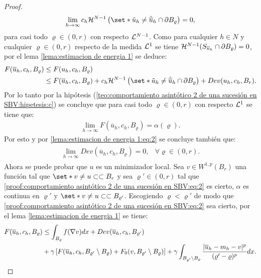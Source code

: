\documentclass[a4paper,11pt,spanish, twoside, leqno]{tfm-uam}
\begin{document}
\begin{proof}
\begin{align*}
\lim_{h\to\infty}c_{h}\Hm{N-1}\left ( \set*{\tilde{u}_{h}\not = \tilde{\overline{u}}_{h}}\cap \partial B_{\varrho}\right )=0,
\end{align*}
para casi todo $\varrho\in (0,r)$ con respecto $\mathcal{L}^{N-1}$. Como para cualquier $h\in N$ y cualquier $\varrho\in (0,r)$ respecto de la medida $\mathcal{L}^{1}$ se tiene $\mathcal{H}^{N-1}(S_{\overline{u}_{h}}\cap \partial B_{\varrho})=0$, por el lema \ref{lema:estimacion de energia 1} se deduce:
\begin{align*}
F(\overline{u}_{h},c_{h},B_{\varrho})&\leq F(u_{h}, c_{h}, B_{\varrho})
\\&\leq F(\overline{u}_{h},c_{h},B_{\varrho})+c_{h}\Hm{N-1}\left( \set*{\tilde{u}_{h}\not =\tilde{\overline{u}}_{h}}\cap \partial B_{\varrho} \right ) + Dev(u_{h}, c_{h}, B_{r}).
\end{align*}
Por lo tanto por la hipótesis (\ref{teo:comportamiento asintótico 2 de una sucesión en SBV:hipetesis:c}) se concluye que para casi todo $\varrho\in (0, r)$ con respecto $\mathcal{L}^{1}$ se tiene que:
\begin{align}\label{proof:comportamiento asintótico 2 de una sucesión en SBV:eq:2}
\lim_{h\to \infty} F(\overline{u}_{h}, c_{h}, B_{\varrho})=\alpha(\varrho).
\end{align}
Por esto y por \ref{lema:estimacion de energia 1:eq:2} se concluye también que:
\begin{align*}
\begin{array}{ll}
\lim_{h\to \infty}Dev(\overline{u}_{h}, c_{h}, B_{\varrho})=0, &\forall \varrho\in (0,r).
\end{array}
\end{align*}
Ahora se puede probar que $u$ es un minimizador local. Sea $v\in  W^{1,p}(B_{r})$ una función tal que $\set*{v\not = u}\subset\subset B_{r}$ y sea $\varrho'\in (0,r)$ tal que \ref{proof:comportamiento asintótico 2 de una sucesión en SBV:eq:2} es cierto, $\alpha$ es continua en $\varrho'$ y $\set*{v\not= u}\subset\subset B_{\varrho'}$. Escogiendo $\varrho<\varrho'$ de modo que \ref{proof:comportamiento asintótico 2 de una sucesión en SBV:eq:2} sea cierto, por el lema \ref{lema:estimacion de energia 1} se tiene:
\begin{align*}
F(\overline{u}_{h},c_{h}, B_{\varrho})&\leq \int_{B_{\varrho}}f(\nabla{v})dx+Dev(\overline{u}_{h}, c_{h}, B_{\varrho'})
\\&+\gamma\left [ F(\overline{u}_{h}, c_{h}, B_{\varrho'}\setminus B_{\varrho})+F_{0}(v,B_{\varrho'}\setminus B_{\varrho})\right]+\gamma \int_{B_{\varrho'}\setminus B_{\varrho}}\dfrac{\abs{\overline{u}_{h}-m_{h}-v}^{p}}{(\varrho'-\varrho)^{p}}dx.

\end{align*}
\end{proof}
\end{document}
